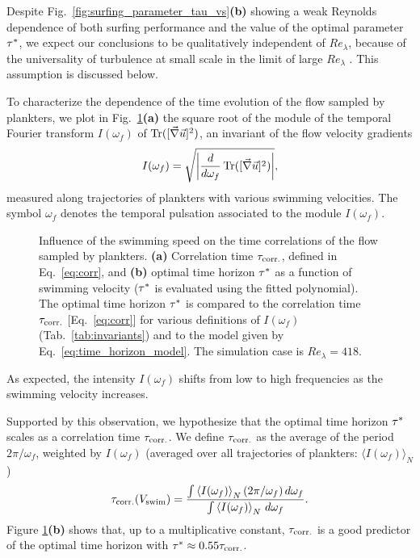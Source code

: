Despite Fig.~\ref{fig:surfing_parameter_tau_vs}\textbf{(b)} showing a weak Reynolds dependence of both surfing performance and the value of the optimal parameter $\TimeHorizonOpt$, we expect our conclusions to be qualitatively independent of $\mathit{Re}_{\lambda}$, because of the universality of turbulence at small scale in the limit of large $\mathit{Re}_{\lambda}$ \citep{frisch1995turbulence}.
This assumption is discussed below.

To characterize the dependence of the time evolution of the flow sampled by plankters, we plot in Fig.~\ref{fig:surfing_correlation_time}\textbf{(a)} the square root of the module of the temporal Fourier transform $I(\omega_f)$ of $\tr([ \Gradients ]^2)$, an invariant of the flow velocity gradients
\begin{equation}
	I(\omega_f) = \sqrt{ \abs*{ \frac{d}{d\omega_f} \tr ( [ \Gradients ]^2 )} },
\end{equation}
measured along trajectories of plankters with various swimming velocities. 
The symbol $\omega_f$ denotes the temporal pulsation associated to the module $I(\omega_f)$.
\begin{figure}%
	\centering
	
	\caption[Influence of the swimming speed on the time correlations of the flow sampled by plankters.]{
		Influence of the swimming speed on the time correlations of the flow sampled by plankters.
		\textbf{(a)} Correlation time $\CorrelationTime$, defined in Eq.~\eqref{eq:corr}, and \textbf{(b)} optimal time horizon $\TimeHorizonOpt$ as a function of swimming velocity ($\TimeHorizonOpt$ is evaluated using the fitted polynomial).
		The optimal time horizon $\TimeHorizonOpt$ is compared to the correlation time $\CorrelationTime$ [Eq.~\eqref{eq:corr}] for various definitions of $I(\omega_f)$ (Tab.~\ref{tab:invariants}) and to the model given by Eq.~\eqref{eq:time_horizon_model}.
		The simulation case is $\mathit{Re}_{\lambda} = 418$.
	}
	\label{fig:surfing_correlation_time}
\end{figure}
As expected, the intensity $I(\omega_f)$ shifts from low to high frequencies as the swimming velocity increases.

Supported by this observation, we hypothesize that the optimal time horizon $\TimeHorizonOpt$ scales as a correlation time $\CorrelationTime$.
We define $\CorrelationTime$ as the average of the period $2\pi/\omega_f$, weighted by $I(\omega_f)$ (averaged over all trajectories of plankters: $\langle I(\omega_f) \rangle_N$)
\begin{equation}
	\label{eq:corr}
	\CorrelationTime (\SwimmingVelocity) = \frac{\int \left\langle I(\omega_f) \right\rangle_N (2\pi/\omega_f) \, d\omega_f}{\int \left\langle I(\omega_f) \right\rangle_N \, d\omega_f}.
\end{equation}
Figure \ref{fig:surfing_correlation_time}\textbf{(b)} shows that, up to a multiplicative constant, $\CorrelationTime$ is a good predictor of the optimal time horizon with $\TimeHorizonOpt \approx 0.55 \CorrelationTime$.

